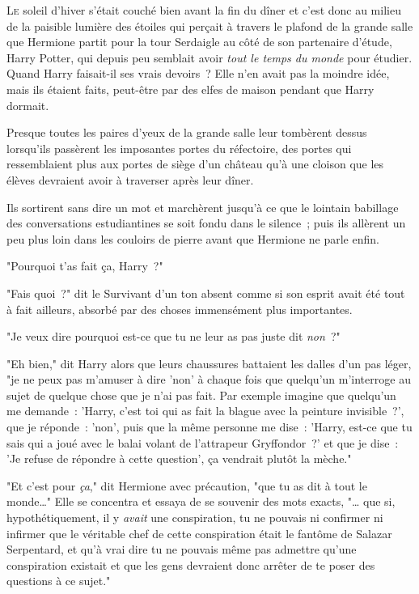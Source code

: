 
\lettrine{L}{e} soleil d'hiver s'était couché bien avant la fin du dîner et c'est donc au milieu de la paisible lumière des étoiles qui perçait à travers le plafond de la grande salle que Hermione partit pour la tour Serdaigle au côté de son partenaire d'étude, Harry Potter, qui depuis peu semblait avoir \emph{tout le temps du monde} pour étudier. Quand Harry faisait-il ses vrais devoirs~? Elle n'en avait pas la moindre idée, mais ils étaient faits, peut-être par des elfes de maison pendant que Harry dormait.

Presque toutes les paires d'yeux de la grande salle leur tombèrent dessus lorsqu'ils passèrent les imposantes portes du réfectoire, des portes qui ressemblaient plus aux portes de siège d'un château qu'à une cloison que les élèves devraient avoir à traverser après leur dîner.

Ils sortirent sans dire un mot et marchèrent jusqu'à ce que le lointain babillage des conversations estudiantines se soit fondu dans le silence~; puis ils allèrent un peu plus loin dans les couloirs de pierre avant que Hermione ne parle enfin.

"Pourquoi t'as fait ça, Harry~?"

"Fais quoi~?" dit le Survivant d'un ton absent comme si son esprit avait été tout à fait ailleurs, absorbé par des choses immensément plus importantes.

"Je veux dire pourquoi est-ce que tu ne leur as pas juste dit \emph{non}~?"

"Eh bien," dit Harry alors que leurs chaussures battaient les dalles d'un pas léger, "je ne peux pas m'amuser à dire 'non' à chaque fois que quelqu'un m'interroge au sujet de quelque chose que je n'ai pas fait. Par exemple imagine que quelqu'un me demande~: 'Harry, c'est toi qui as fait la blague avec la peinture invisible~?', que je réponde~: 'non', puis que la même personne me dise~: 'Harry, est-ce que tu sais qui a joué avec le balai volant de l'attrapeur Gryffondor~?' et que je dise~: 'Je refuse de répondre à cette question', ça vendrait plutôt la mèche."

"Et c'est pour \emph{ça}," dit Hermione avec précaution, "que tu as dit à tout le monde…" Elle se concentra et essaya de se souvenir des mots exacts, "… que si, hypothétiquement, il y \emph{avait} une conspiration, tu ne pouvais ni confirmer ni infirmer que le véritable chef de cette conspiration était le fantôme de Salazar Serpentard, et qu'à vrai dire tu ne pouvais même pas admettre qu'une conspiration existait et que les gens devraient donc arrêter de te poser des questions à ce sujet."

